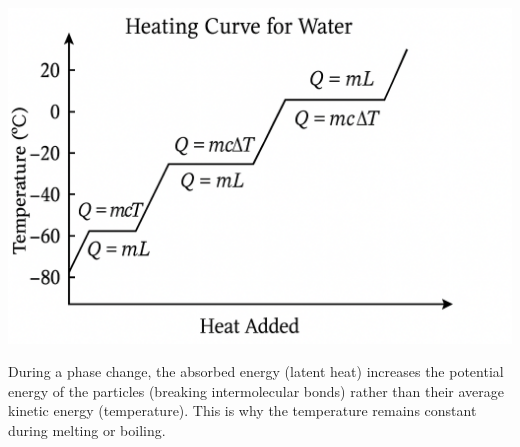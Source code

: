 
\begin{marginfigure}[-20pt] %
\includegraphics[width=\linewidth]{water_heating.png} %
\caption{Heating curve for water. Sloped sections represent temperature increases (Q=mc\textDelta T applies). Flat sections represent phase changes at constant temperature (Q=mL applies): melting at 0°C and boiling at 100°C.}
\label{fig:heating_curve}
\end{marginfigure}

During a phase change, the absorbed energy (latent heat) increases the potential energy of the particles (breaking intermolecular bonds) rather than their average kinetic energy (temperature). This is why the temperature remains constant during melting or boiling.


